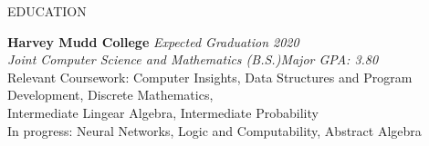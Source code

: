 \documentclass{resume} %
\begin{document}

\begin{rSection}{EDUCATION}

{\bf Harvey Mudd College} \hfill {\em Expected Graduation 2020} \\
{\em Joint Computer Science and Mathematics (B.S.)}\hfill {\em Major GPA: 3.80} \\
Relevant Coursework: Computer Insights, Data Structures and Program Development, Discrete Mathematics, \\Intermediate Lingear Algebra, Intermediate Probability\\
In progress: Neural Networks, Logic and Computability, Abstract Algebra
\end{rSection}
\end{document}
